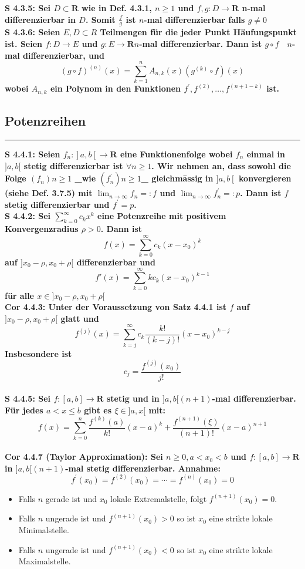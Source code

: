 \documentclass[7pt,landscape, margin = 0.1mm]{article}
\newcommand*{\mysubsection}[1]{\vspace{-2mm}\color{chaptercolor}\subsection{ #1 }
\vspace{-1mm}\hrule\vspace{1.5mm}\color{black}
\vspace{2mm}}
\newcommand{\COR}[2]{\color{chaptercolor}\bf{Cor #1}:\color{black}    \hspace{0.2cm} #2 \\}
\newcommand{\SA}[2]{\color{chaptercolor}\bf{S #1}:\color{black}    \hspace{0.2cm} #2 \\}
\begin{document}
\begin{multicols}{4}
\begin{flushleft}
\SA{4.3.5}{Sei $D \subset \mathbf{R}$ wie in Def. 4.3.1, $n \geqslant 1$ und $f, g: D \longrightarrow \mathbf{R}$ n-mal differenzierbar in $D$. Somit $\frac{f}{g}$ ist $n$-mal differenzierbar falls $g \neq 0$}

\SA{4.3.6}{Seien $E, D \subset R$ Teilmengen für die jeder Punkt Häufungspunkt ist. Seien $f: D \longrightarrow E$ und $g: E \longrightarrow \mathbf{R} n$-mal differenzierbar. Dann ist $g \circ f \quad n$-mal differenzierbar, und
$$
(g \circ f)^{(n)}(x)=\sum_{k=1}^n A_{n, k}(x)\left(g^{(k)} \circ f\right)(x)
$$
wobei $A_{n, k}$ ein Polynom in den Funktionen $f^{\prime}, f^{(2)}, \ldots, f^{(n+1-k)}$ ist.}
\mysubsection{Potenzreihen}
\SA{4.4.1}{Seien $\left.f_n:\right] a, b\left[\longrightarrow \mathbf{R}\right.$ eine Funktionenfolge wobei $f_n$ einmal in $] a, b[$ stetig differenzierbar ist $\forall n \geqslant 1$. Wir nehmen an, dass sowohl die Folge $\left(f_n\right){n \geqslant 1}$ _wie $\left(f_n^{\prime}\right){n \geqslant 1}$_ gleichmāssig in $] a, b\left[\right.$ konvergieren (siehe Def. 3.7.5) mit $\lim _{n \rightarrow \infty} f_n=: f$ und $\lim _{n \rightarrow \infty} f_n^{\prime}=: p$. Dann ist $f$ stetig differenzierbar und $f^{\prime}=p$.}
\SA{4.4.2}{Sei $\sum_{k=0}^{\infty} c_kx^k$ eine Potenzreihe mit positivem Konvergenzradius $\rho >0$. Dann ist
$$ f(x)=\sum_{k=0}^{\infty} c_k(x-x_0)^k $$
auf $]x_0-\rho, x_0 + \rho[$ differenzierbar und
$$ f'(x)=\sum_{k=0}^{\infty}k c_k(x-x_0)^{k-1} $$
für alle $x \in ]x_0-\rho, x_0 + \rho[$}
\COR{4.4.3}{Unter der Voraussetzung von Satz 4.4.1 ist $f$ auf $] x_0-\rho, x_0+\rho[$ glatt und
$$ f^{(j)}(x)=\sum_{k=j}^{\infty} c_k \frac{k !}{(k-j) !}\left(x-x_0\right)^{k-j} $$
Insbesondere ist
$$ c_j=\frac{f^{(j)}\left(x_0\right)}{j !} $$}
\SA{4.4.5}{Sei $f:[a, b] \longrightarrow \mathbf{R}$ stetig und in $] a, b[(n+1)$-mal differenzierbar. Für jedes $a<x \leqslant b$ gibt es $\xi \in] a, x[$ mit:
$$ f(x)=\sum_{k=0}^n \frac{f^{(k)}(a)}{k !}(x-a)^k+\frac{f^{(n+1)}(\xi)}{(n+1) !}(x-a)^{n+1} $$}
\COR{4.4.7 (Taylor Approximation)}{ Sei $n \geqslant 0, a<x_0<b$ und $f:[a, b] \longrightarrow \mathbf{R}$ in $] a, b[(n+1)$-mal stetig differenzierbar. Annahme:
$$ f^{\prime}\left(x_0\right)=f^{(2)}\left(x_0\right)=\cdots=f^{(n)}\left(x_0\right)=0 $$
\begin{itemize}
\item[1.] Falls $n$ gerade ist und $x_0$ lokale Extremalstelle, folgt $f^{(n+1)}\left(x_0\right)=0$.
\item[2.] Falls $n$ ungerade ist und $f^{(n+1)}\left(x_0\right)>0$ so ist $x_0$ eine strikte lokale Minimalstelle.
\item[3.] Falls $n$ ungerade ist und $f^{(n+1)}\left(x_0\right)<0$ so ist $x_0$ eine strikte lokale Maximalstelle. \end{itemize}}


\end{flushleft}
\end{multicols}
\end{document}
